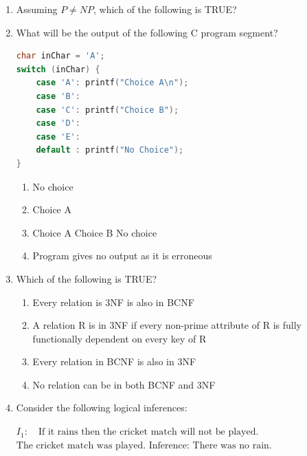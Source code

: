 \documentclass[journal]{IEEEtran}
\numberwithin{equation}{enumi}
\numberwithin{figure}{enumi}
\begin{document}
\begin{enumerate}
\item Assuming $P \ne NP$, which of the following is TRUE?
  \begin{enumerate}
\end{enumerate}

\item What will be the output of the following C program segment?

\begin{lstlisting}[language=C]
char inChar = 'A';
switch (inChar) {
    case 'A': printf("Choice A\n");
    case 'B': 
    case 'C': printf("Choice B");
    case 'D': 
    case 'E': 
    default : printf("No Choice");
}
\end{lstlisting}

\begin{enumerate}
    \item No choice
    \item Choice A
    \item Choice A 
          Choice B No choice
    \item Program gives no output as it is erroneous
\end{enumerate}

\item Which of the following is TRUE? 
\begin{enumerate}
    \item  Every relation is $3$NF is also in BCNF
    \item A relation R is in $3$NF if every non-prime attribute of R is fully functionally dependent on
every key of R
    \item Every relation in BCNF is also in $3$NF
    \item No relation can be in both BCNF and $3$NF 
\end{enumerate}

\item Consider the following logical inferences:

$I_1 : \quad \text{If it rains then the cricket match will not be played.} $
$\text{The cricket match was played.}$
$\text{Inference: There was no rain.}$


\end{enumerate}
\end{document}
